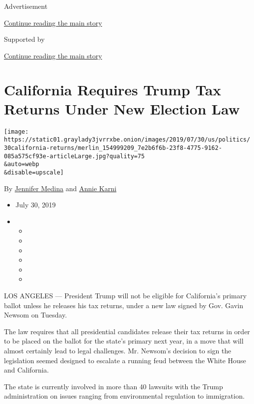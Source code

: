 Advertisement

\protect\hyperlink{after-top}{Continue reading the main story}

Supported by

\protect\hyperlink{after-sponsor}{Continue reading the main story}

\hypertarget{california-requires-trump-tax-returns-under-new-election-law}{%
\section{California Requires Trump Tax Returns Under New Election
Law}\label{california-requires-trump-tax-returns-under-new-election-law}}

\texttt{[image: https://static01.graylady3jvrrxbe.onion/images/2019/07/30/us/politics/30california-returns/merlin\_154999209\_7e2b6f6b-23f8-4775-9162-085a575cf93e-articleLarge.jpg?quality=75\\\&auto=webp\\\&disable=upscale]}

By \href{https://www.nytimes3xbfgragh.onion/by/jennifer-medina}{Jennifer
Medina} and
\href{https://www.nytimes3xbfgragh.onion/by/annie-karni}{Annie Karni}

\begin{itemize}
\item
  July 30, 2019
\item
  \begin{itemize}
  \item
  \item
  \item
  \item
  \item
  \item
  \end{itemize}
\end{itemize}

LOS ANGELES --- President Trump will not be eligible for California's
primary ballot unless he releases his tax returns, under a new law
signed by Gov. Gavin Newsom on Tuesday.

The law requires that all presidential candidates release their tax
returns in order to be placed on the ballot for the state's primary next
year, in a move that will almost certainly lead to legal challenges. Mr.
Newsom's decision to sign the legislation seemed designed to escalate a
running feud between the White House and California.

The state is currently involved in more than 40 lawsuits with the Trump
administration on issues ranging from environmental regulation to
immigration.

